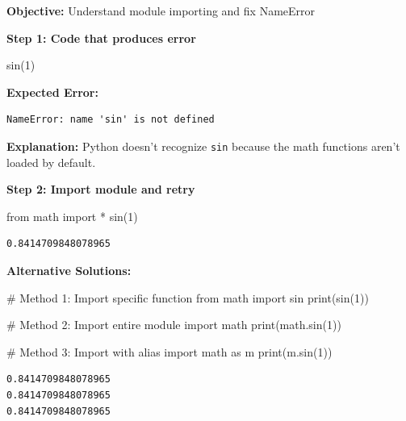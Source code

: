 \documentclass[
  11pt,
]{article}
\newenvironment{Shaded}{\begin{snugshade}}{\end{snugshade}}
\newcommand{\BuiltInTok}[1]{\textcolor[rgb]{0.00,0.23,0.31}{#1}}
\newcommand{\CommentTok}[1]{\textcolor[rgb]{0.37,0.37,0.37}{#1}}
\newcommand{\DecValTok}[1]{\textcolor[rgb]{0.68,0.00,0.00}{#1}}
\newcommand{\ImportTok}[1]{\textcolor[rgb]{0.00,0.46,0.62}{#1}}
\newcommand{\NormalTok}[1]{\textcolor[rgb]{0.00,0.23,0.31}{#1}}
\newcommand{\OperatorTok}[1]{\textcolor[rgb]{0.37,0.37,0.37}{#1}}
\begin{document}
\textbf{Objective:} Understand module importing and fix NameError

\textbf{Step 1: Code that produces error}

\begin{Shaded}
\begin{Highlighting}[]
\NormalTok{sin(}\DecValTok{1}\NormalTok{)}
\end{Highlighting}
\end{Shaded}

\textbf{Expected Error:}

\begin{verbatim}
NameError: name 'sin' is not defined
\end{verbatim}

\textbf{Explanation:} Python doesn't recognize \texttt{sin} because the
math functions aren't loaded by default.

\textbf{Step 2: Import module and retry}

\begin{Shaded}
\begin{Highlighting}[]
\ImportTok{from}\NormalTok{ math }\ImportTok{import} \OperatorTok{*}
\NormalTok{sin(}\DecValTok{1}\NormalTok{)}
\end{Highlighting}
\end{Shaded}

\begin{verbatim}
0.8414709848078965
\end{verbatim}

\textbf{Alternative Solutions:}

\begin{Shaded}
\begin{Highlighting}[]
\CommentTok{\# Method 1: Import specific function}
\ImportTok{from}\NormalTok{ math }\ImportTok{import}\NormalTok{ sin}
\BuiltInTok{print}\NormalTok{(sin(}\DecValTok{1}\NormalTok{))}

\CommentTok{\# Method 2: Import entire module}
\ImportTok{import}\NormalTok{ math}
\BuiltInTok{print}\NormalTok{(math.sin(}\DecValTok{1}\NormalTok{))}

\CommentTok{\# Method 3: Import with alias}
\ImportTok{import}\NormalTok{ math }\ImportTok{as}\NormalTok{ m}
\BuiltInTok{print}\NormalTok{(m.sin(}\DecValTok{1}\NormalTok{))}
\end{Highlighting}
\end{Shaded}

\begin{verbatim}
0.8414709848078965
0.8414709848078965
0.8414709848078965
\end{verbatim}
\end{document}
